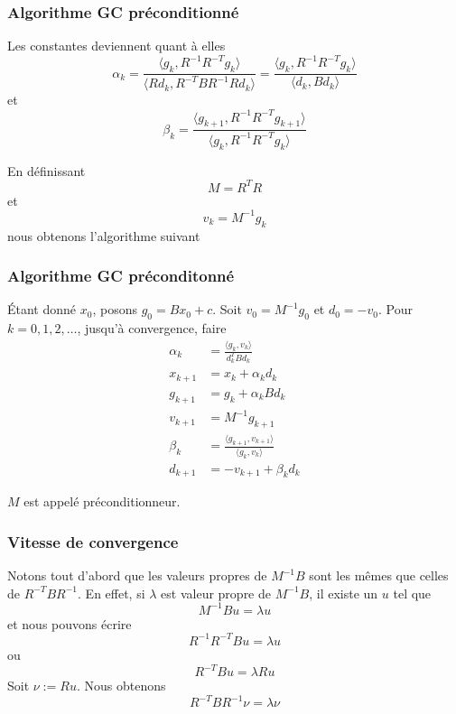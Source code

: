 \documentclass[usepdftitle=false]{beamer}
\begin{document}
\begin{frame}
\frametitle{Algorithme GC préconditionné}

Les constantes deviennent quant à elles
$$
\alpha_k = \frac{\langle g_k, R^{-1}R^{-T}g_k \rangle}{\langle Rd_k, R^{-T}BR^{-1} Rd_k\rangle}
= \frac{\langle g_k, R^{-1}R^{-T}g_k \rangle}{\langle d_k, B d_k \rangle}
$$
et
$$
\beta_k = \frac{\langle g_{k+1}, R^{-1}R^{-T}g_{k+1} \rangle}{\langle g_k, R^{-1}R^{-T}g_k \rangle}
$$

\mbox{}

En définissant
$$
M = R^TR
$$
et
$$
v_k = M^{-1}g_k
$$
nous obtenons l'algorithme suivant

\end{frame}

\begin{frame}
\frametitle{Algorithme GC préconditonné}


Étant donné $x_0$, posons $g_0 = B x_0 + c$.
Soit $v_0 = M^{-1} g_0$ et $d_0 = -v_0$.
Pour $k = 0,1,2,\ldots$, jusqu'à convergence, faire
\begin{align*}
\alpha_k &= \frac{\langle g_k, v_k \rangle}{d_k^T B d_k} \\
x_{k+1} &= x_k + \alpha_k d_k \\
g_{k+1} &= g_k + \alpha_k B d_k \\
v_{k+1} &= M^{-1}g_{k+1} \\
\beta_k &= \frac{\langle g_{k+1}, v_{k+1} \rangle}{\langle g_k, v_k \rangle} \\
d_{k+1} &= -v_{k+1} + \beta_k d_k
\end{align*}

\mbox{}

$M$ est appelé préconditionneur.

\end{frame}

\begin{frame}
\frametitle{Vitesse de convergence}

Notons tout d'abord que les valeurs propres de $M^{-1}B$ sont les mêmes que celles de $R^{-T}BR^{-1}$.
En effet, si $\lambda$ est valeur propre de $M^{-1}B$, il existe un $u$ tel que
$$
M^{-1}B u = \lambda u
$$
et nous pouvons écrire
$$
R^{-1}R^{-T}B u = \lambda u
$$
ou
$$
R^{-T}B u = \lambda Ru
$$
Soit $\nu := Ru$. Nous obtenons
$$
R^{-T}B R^{-1}\nu = \lambda \nu
$$
\end{frame}
\end{document}
